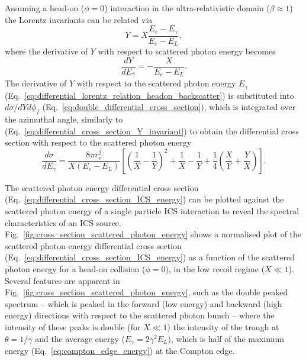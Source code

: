\documentclass[../main.tex]{subfiles}
\begin{document}
Assuming a head-on ($\phi=0$) interaction in the ultra-relativistic domain ($\beta\approx1$) the Lorentz invariants can be related via
\begin{equation}
Y = X\frac{E_{e}-E_{\gamma}}{E_{e}-E_{L}},
\label{eq:lorentz_relation_headon_backscatter}
\end{equation}
where the derivative of $Y$ with respect to scattered photon energy becomes
\begin{equation}
\frac{dY}{dE_{\gamma}} = -\frac{X}{E_{e}-E_{L}}.
\label{eq:differential_lorentz_relation_headon_backscatter}
\end{equation}
The derivative of $Y$ with respect to the scattered photon energy $E_{\gamma}$ (Eq.~\ref{eq:differential_lorentz_relation_headon_backscatter}) is substituted into $d\sigma/dYd\phi_{f}$ (Eq.~\ref{eq:double_differential_cross_section}), which is integrated over the azimuthal angle, similarly to (Eq.~\ref{eq:differential_cross_section_Y_invariant}) to obtain the differential cross section with respect to the scattered photon energy
\begin{equation}
\frac{d\sigma}{dE_{\gamma}} = \frac{8\pi r_{e}^{2}}{X\left(E_{e}-E_{L}\right)}\left[\left(\frac{1}{X}-\frac{1}{Y}\right)^{2}+\frac{1}{X}-\frac{1}{Y}+\frac{1}{4}\left(\frac{X}{Y}+\frac{Y}{X}\right)\right].
\label{eq:differential_cross_section_ICS_energy}    
\end{equation}

The scattered photon energy differential cross section (Eq.~\ref{eq:differential_cross_section_ICS_energy}) can be plotted against the scattered photon energy of a single particle ICS interaction to reveal the spectral characteristics of an ICS source. Fig.~\ref{fig:cross_section_scattered_photon_energy} shows a normalised plot of the scattered photon energy differential cross section (Eq.~\ref{eq:differential_cross_section_ICS_energy}) as a function of the scattered photon energy for a head-on collision ($\phi=0$), in the low recoil regime ($X \ll 1$). Several features are apparent in Fig.~\ref{fig:cross_section_scattered_photon_energy}, such as the double peaked spectrum -- which is peaked in the forward (low energy) and backward (high energy) directions with respect to the scattered photon bunch -- where the intensity of these peaks is double (for $X \ll 1$) the intensity of the trough at $\theta=1/\gamma$ and the average energy ($E_{\gamma} = 2\gamma^{2}E_{L}$), which is half of the maximum energy (Eq.~\ref{eq:compton_edge_energy}) at the Compton edge.   
\end{document}
